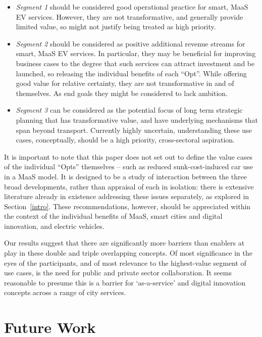 \documentclass[b5paper,10pt]{article}
\begin{document}
\begin{itemize}
\item {\emph{Segment 1}} should be considered good operational
practice for smart, MaaS EV services. However, they are not
transformative, and generally provide limited value, so might not
justify being treated as high priority.
\item {\emph{Segment 2}} should be considered as positive additional
revenue streams for smart, MaaS EV services. In particular, they may
be beneficial for improving business cases to the degree that such
services can attract investment and be launched, so releasing the
individual benefits of each ``Opt''. While offering good value for
relative certainty, they are not transformative in and of themselves.
As end goals they might be considered to lack ambition.
\item {\emph{Segment 3}} can be considered as the potential focus of
long term strategic planning that has transformative value, and have
underlying mechanisms that span beyond transport. Currently highly
uncertain, understanding these use cases, conceptually, should be a
high priority, cross-sectoral aspiration.
\end{itemize}

It is important to note that this paper does not set out to define the
value cases of the individual ``Opts'' themselves -- such as reduced
sunk-cost-induced car use in a MaaS model. It is designed to be a
study of interaction between the three broad developments, rather than
appraisal of each in isolation: there is extensive literature already
in existence addressing these issues separately, as explored in
Section~\ref{intro}. These recommendations, however, should be
appreciated within the context of the individual benefits of MaaS,
smart cities and digital innovation, and electric vehicles.

Our results suggest that there are significantly more barriers than
enablers at play in these double and triple overlapping concepts. Of
most significance in the eyes of the participants, and of most
relevance to the highest-value segment of use cases, is the need for
public and private sector collaboration. It seems reasonable to
presume this is a barrier for `as-a-service' and digital innovation
concepts across a range of city services.

\section{Future Work}\label{future}
\end{document}
